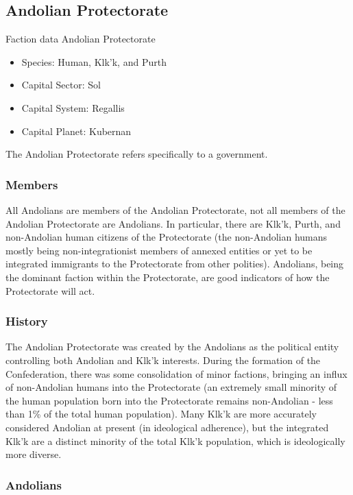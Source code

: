 \subsection{Andolian Protectorate}

Faction data Andolian Protectorate 
\begin{itemize}
\item Species: Human, Klk'k, and Purth
\item Capital Sector: Sol
\item Capital System: Regallis
\item Capital Planet: Kubernan
\end{itemize}

The Andolian Protectorate refers specifically to a government. 

\subsubsection{Members}

All Andolians are members of the Andolian Protectorate, not all
members of the Andolian Protectorate are Andolians. In particular,
there are Klk'k, Purth, and non-Andolian human citizens of the
Protectorate (the non-Andolian humans mostly being non-integrationist
members of annexed entities or yet to be integrated immigrants to the
Protectorate from other polities). Andolians, being the dominant
faction within the Protectorate, are good indicators of how the
Protectorate will act.

\subsubsection{History}

The Andolian Protectorate was created by the Andolians as the
political entity controlling both Andolian and Klk'k interests. During
the formation of the Confederation, there was some consolidation of
minor factions, bringing an influx of non-Andolian humans into the
Protectorate (an extremely small minority of the human population born
into the Protectorate remains non-Andolian - less than 1\% of the total
human population). Many Klk'k are more accurately considered Andolian
at present (in ideological adherence), but the integrated Klk'k are a
distinct minority of the total Klk'k population, which is
ideologically more diverse.


\subsubsection{Andolians}

